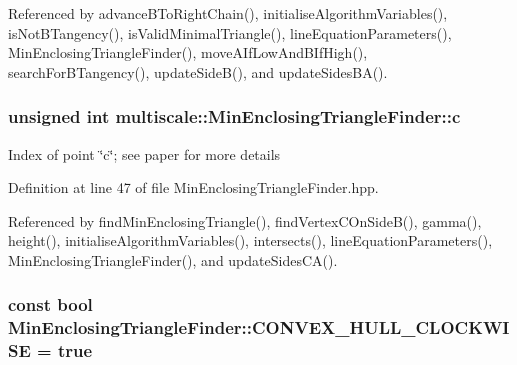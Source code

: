 \-Referenced by advance\-B\-To\-Right\-Chain(), initialise\-Algorithm\-Variables(), is\-Not\-B\-Tangency(), is\-Valid\-Minimal\-Triangle(), line\-Equation\-Parameters(), \-Min\-Enclosing\-Triangle\-Finder(), move\-A\-If\-Low\-And\-B\-If\-High(), search\-For\-B\-Tangency(), update\-Side\-B(), and update\-Sides\-B\-A().

\hypertarget{classmultiscale_1_1MinEnclosingTriangleFinder_a758f39b2d0cf35337f28d8ed871c2c0b}{
\subsubsection[{c}]{\setlength{\rightskip}{0pt plus 5cm}unsigned int {\bf multiscale\-::\-Min\-Enclosing\-Triangle\-Finder\-::c}}}\label{classmultiscale_1_1MinEnclosingTriangleFinder_a758f39b2d0cf35337f28d8ed871c2c0b}
\-Index of point \char`\"{}c\char`\"{}; see paper for more details 

\-Definition at line 47 of file \-Min\-Enclosing\-Triangle\-Finder.\-hpp.



\-Referenced by find\-Min\-Enclosing\-Triangle(), find\-Vertex\-C\-On\-Side\-B(), gamma(), height(), initialise\-Algorithm\-Variables(), intersects(), line\-Equation\-Parameters(), \-Min\-Enclosing\-Triangle\-Finder(), and update\-Sides\-C\-A().

\hypertarget{classmultiscale_1_1MinEnclosingTriangleFinder_a951b35e4f359e61301deb0840abea51a}{
\subsubsection[{\-C\-O\-N\-V\-E\-X\-\_\-\-H\-U\-L\-L\-\_\-\-C\-L\-O\-C\-K\-W\-I\-S\-E}]{\setlength{\rightskip}{0pt plus 5cm}const bool {\bf \-Min\-Enclosing\-Triangle\-Finder\-::\-C\-O\-N\-V\-E\-X\-\_\-\-H\-U\-L\-L\-\_\-\-C\-L\-O\-C\-K\-W\-I\-S\-E} = true}}\label{classmultiscale_1_1MinEnclosingTriangleFinder_a951b35e4f359e61301deb0840abea51a}



